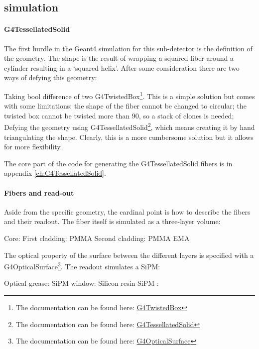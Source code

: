 \begin{refsection}
    \subsection{\gf simulation}
        \paragraph{G4TessellatedSolid} The first hurdle in the Geant4 simulation for this sub-detector is the definition of the geometry. 
        The shape is the result of wrapping a squared fiber around a cylinder resulting in a `squared helix'.
        After some consideration there are two ways of defying this geometry:
        \begin{outline}
            \1 Taking bool difference of two G4TwistedBox\footnote{The documentation can be found here: \href{https://apc.u-paris.fr/~franco/g4doxy/html/classG4TwistedBox.html}{G4TwistedBox}}. 
            This is a simple solution but comes with some limitations: the shape of the fiber cannot be changed to circular; the twisted box cannot be twisted more than \SI{90}{\deg}, so a stack of clones is needed; 
            \1 Defying the geometry using G4TessellatedSolid\footnote{The documentation can be found here: \href{https://apc.u-paris.fr/~franco/g4doxy/html/classG4TessellatedSolid.html}{G4TessellatedSolid}}, which means creating it by hand triangulating the shape. Clearly, this is a more cumbersome solution but it allows for more flexibility.
        \end{outline}
        The core part of the code for generating the G4TessellatedSolid fibers is in appendix \ref{ch:G4TessellatedSolid}.

        \paragraph{Fibers and read-out} Aside from the specific geometry, the cardinal point is how to describe the fibers and their readout. 
        The fiber itself is simulated as a three-layer volume:
        \begin{outline}
            \1 Core: 
            \1 First cladding: PMMA
            \1 Second cladding: PMMA EMA
        \end{outline}
        The optical property of the surface between the different layers is specified with a G4OpticalSurface\footnote{The documentation can be found here: \href{https://apc.u-paris.fr/~franco/g4doxy/html/classG4OpticalSurface.html}{G4OpticalSurface}}.
        The readout simulates a SiPM:
        \begin{outline}
            \1 Optical grease: 
            \1 SiPM window: Silicon resin
            \1 SiPM :
        \end{outline}


\end{refsection}
